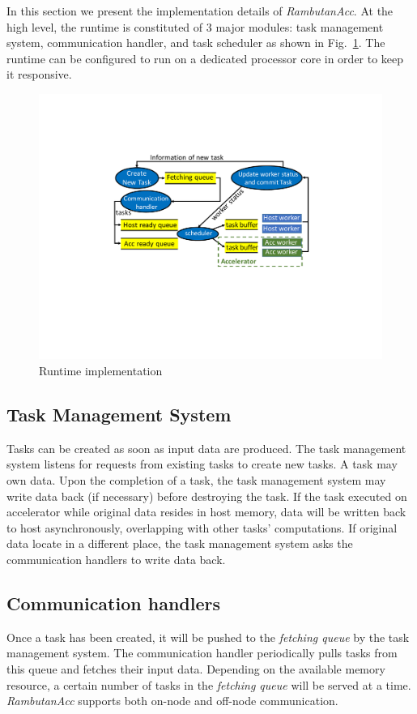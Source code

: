 In this section we present the implementation details of {\em RambutanAcc}.
At the high level, the runtime is constituted of 3 major modules: task management system, communication handler, and task scheduler as shown in Fig.~\ref{fig:impl}. 
The runtime can be configured to run on a dedicated processor core in order to keep it responsive.

\begin{figure}[htb]
\centering
\includegraphics[width=.49\textwidth]{figures/impl.pdf}
\caption{Runtime implementation}
\label{fig:impl}
\end{figure}

\subsection{Task Management System}
Tasks can be created as soon as input data are produced.
The task management system listens for requests from existing tasks to create new tasks.
A task may own data.
Upon the completion of a task, the task management system may write data back (if necessary) before destroying the task.
If the task executed on accelerator while original data resides in host memory, data will be written back to host asynchronously, overlapping with other tasks' computations.
If original data locate in a different place, the task management system asks the communication handlers to write data back.

\subsection{Communication handlers}
Once a task has been created, it will be pushed to the {\em fetching queue} by the task management system.
The communication handler periodically pulls tasks from this queue and fetches their input data.
Depending on the available memory resource, a certain number of tasks in the {\em fetching queue} will be served at a time.
{\em RambutanAcc} supports both on-node and off-node communication.

